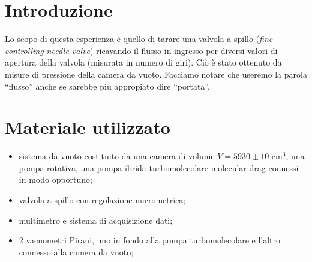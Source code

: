 \section{Introduzione}

Lo scopo di questa esperienza è quello di tarare una valvola a spillo (\textit{fine controlling needle valve}) ricavando il flusso in ingresso per diversi valori di apertura della valvola (misurata in numero di giri). Ciò è stato ottenuto da misure di pressione della camera da vuoto. Facciamo notare che useremo la parola ``flusso'' anche se sarebbe più appropiato dire ``portata''.

\section{Materiale utilizzato}

\begin{itemize}
	\item{sistema da vuoto costituito da una camera di volume $V = 5930 \pm 10$ \si{\centi\metre}$^3$, una pompa rotativa, una pompa ibrida turbomolecolare-molecular drag connessi in modo opportuno;}
	\item{valvola a spillo con regolazione micrometrica;}
	\item{multimetro e sistema di acquisizione dati;}
	\item{2 vacuometri Pirani, uno in fondo alla pompa turbomolecolare e l'altro connesso alla camera da vuoto;}
\end{itemize}
